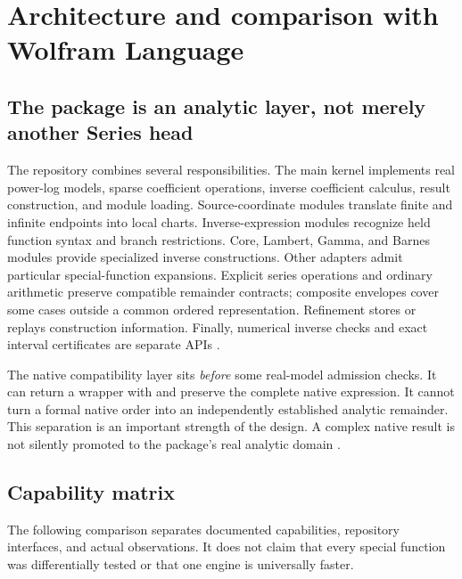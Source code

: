 \documentclass[11pt,letterpaper]{article}
\newcommand{\code}[1]{\texttt{\detokenize{#1}}}
\begin{document}
\section{Architecture and comparison with Wolfram Language}

\subsection{The package is an analytic layer, not merely another Series head}

The repository combines several responsibilities. The main kernel implements
real power-log models, sparse coefficient operations, inverse coefficient
calculus, result construction, and module loading. Source-coordinate modules
translate finite and infinite endpoints into local charts. Inverse-expression
modules recognize held function syntax and branch restrictions. Core,
Lambert, Gamma, and Barnes modules provide specialized inverse constructions.
Other adapters admit particular special-function expansions. Explicit series
operations and ordinary arithmetic preserve compatible remainder contracts;
composite envelopes cover some cases outside a common ordered representation.
Refinement stores or replays construction information. Finally, numerical
inverse checks and exact interval certificates are separate APIs
\cite{repo-kernel,repo-main,repo-arithmetic,repo-cert}.

The native compatibility layer sits \emph{before} some real-model admission
checks. It can return a \code{GeneralizedSeries} wrapper with
\code{"Kind" -> "Native"} and preserve the complete native expression. It
cannot turn a formal native order into an independently established analytic
remainder. This separation is an important strength of the design. A complex
native result is not silently promoted to the package's real analytic domain
\cite{native-contract}.

\subsection{Capability matrix}

The following comparison separates documented capabilities, repository
interfaces, and actual observations. It does not claim that every special
function was differentially tested or that one engine is universally faster.
\end{document}
